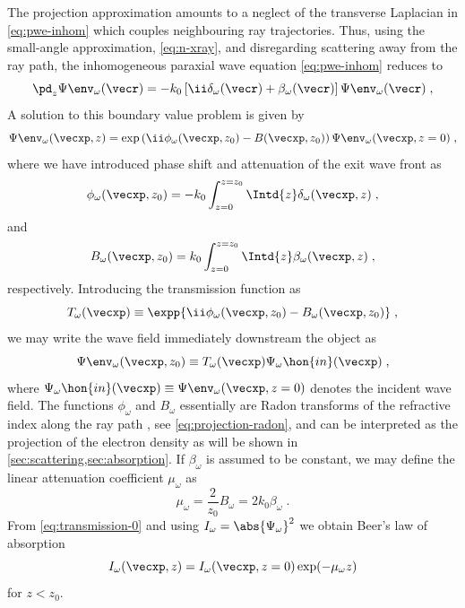 \documentclass[
twoside,
openright,
titlepage,
numbers=noenddot,
headinclude,
fleqn,
a4paper,
footinclude=true,
cleardoublepage=empty,
abstractoff,
BCOR=5mm,
paper=a4,
fontsize=11pt,
british,ngerman,american,
]{scrreprt}
\begin{document}
The projection approximation amounts to a neglect of the transverse
Laplacian in \cref{eq:pwe-inhom} which couples neighbouring ray
trajectories.  Thus, using the small-angle approximation,
\cref{eq:n-xray}, and disregarding scattering away from the ray path,
the inhomogeneous paraxial wave equation \eqref{eq:pwe-inhom} reduces
to
\begin{equation}
    \label{eq:proj-approx-0}
    \pd_z\Psi\env_{\omega}(\vecr) = 
    -k_0\left[\ii  \delta_\omega(\vecr) +\beta_\omega(\vecr)\right]
    \Psi\env_{\omega}(\vecr)\;,
\end{equation}
A solution to this boundary value problem is given by
\begin{equation}
  \label{eq:transmission-0}
    \Psi\env_{\omega}(\vecxp,z) = 
    \exp\left(\ii\phi_\omega(\vecxp,z_0) -B(\vecxp,z_0) \right) 
    \Psi\env_{\omega}(\vecxp,z=0) \;,
\end{equation}
where we have introduced phase shift and attenuation of the exit
wave front as
\begin{equation}
  \label{eq:phase-shift}
  \phi_\omega(\vecxp,z_0) = 
  -k_0\int_{z=0}^{z=z_0}\Intd{z}\delta_\omega(\vecxp,z) \;,
\end{equation}
and
\begin{equation}
  \label{eq:attenuation}
  B_\omega(\vecxp,z_0) = 
  k_0\int_{z=0}^{z=z_0}\Intd{z}\beta_\omega(\vecxp,z) \;,
\end{equation}
respectively.  Introducing the transmission function as
\begin{equation}
  \label{eq:transmission-function}
  T_\omega (\vecxp) 
  \equiv \expp{\ii\phi_\omega(\vecxp,z_0)-B_\omega(\vecxp,z_0)} \;,
\end{equation}
we may write the wave field immediately downstream the object as
\begin{equation}
  \label{eq:transmission}
  \Psi\env_\omega(\vecxp,z_0) \equiv 
  T_\omega(\vecxp)\Psi_\omega\hon{in}(\vecxp) \;,
\end{equation}
where $\Psi_\omega\hon{in}(\vecxp) \equiv
\Psi\env_{\omega}(\vecxp,z=0)$ denotes the incident wave field.  The
functions $\phi_\omega$ and $B_\omega$ essentially are Radon
transforms of the refractive index along the ray path
\cite{Radon1917}, see \cref{eq:projection-radon}, and can be
interpreted as the projection of the electron density as will be shown
in \cref{sec:scattering,sec:absorption}.  If $\beta_\omega$ is assumed
to be constant, we may define the linear attenuation coefficient
$\mu_\omega$ as
\begin{equation}
  \label{eq:linear-attenuation}
  \mu_\omega = \frac{2}{z_0}B_\omega=2k_0\beta_\omega \;.
\end{equation}
From \cref{eq:transmission-0} and using $I_\omega = \abs{\Psi_\omega}^2$
we obtain Beer's law of absorption
\begin{equation}
  \label{eq:beers-law}
  I_\omega(\vecxp,z) = I_\omega(\vecxp,z=0)\exp(-\mu_\omega z)
\end{equation}
for $z<z_0$.
\end{document}
